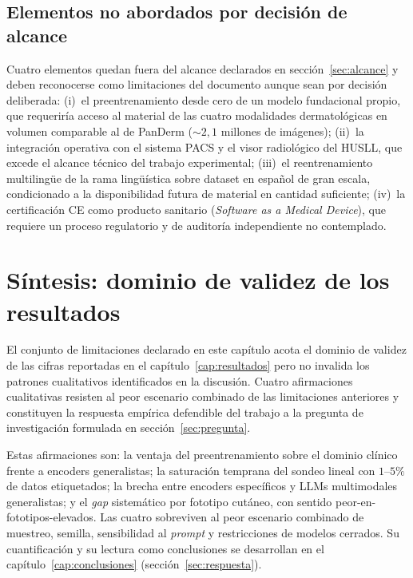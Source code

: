 \subsection{Elementos no abordados por decisión de alcance}
\label{sec:lim-fuera}

Cuatro elementos quedan fuera del alcance declarados en
sección~\ref{sec:alcance} y deben reconocerse como limitaciones del
documento aunque sean por decisión deliberada: (i)~el
preentrenamiento desde cero de un modelo fundacional propio, que
requeriría acceso al material de las cuatro modalidades
dermatológicas en volumen comparable al de PanDerm
($\sim 2{,}1$ millones de imágenes); (ii)~la integración
operativa con el sistema PACS y el visor radiológico del HUSLL,
que excede el alcance técnico del trabajo experimental;
(iii)~el reentrenamiento multilingüe de la rama lingüística sobre
dataset en español de gran escala, condicionado a la disponibilidad
futura de material en cantidad suficiente; (iv)~la certificación
CE como producto sanitario (\emph{Software as a Medical Device}),
que requiere un proceso regulatorio y de auditoría independiente
no contemplado.

\section{Síntesis: dominio de validez de los resultados}
\label{sec:lim-sintesis}

El conjunto de limitaciones declarado en este capítulo acota el
dominio de validez de las cifras reportadas en el
capítulo~\ref{cap:resultados} pero no invalida los patrones
cualitativos identificados en la discusión. Cuatro afirmaciones
cualitativas resisten al peor escenario combinado de las
limitaciones anteriores y constituyen la respuesta empírica
defendible del trabajo a la pregunta de investigación formulada
en sección~\ref{sec:pregunta}.

Estas afirmaciones son: la ventaja del preentrenamiento sobre el
dominio clínico frente a encoders generalistas; la saturación
temprana del sondeo lineal con $1$--$5\%$ de datos etiquetados; la
brecha entre encoders específicos y LLMs multimodales generalistas;
y el \emph{gap} sistemático por fototipo cutáneo, con sentido
peor-en-fototipos-elevados. Las cuatro sobreviven al peor escenario
combinado de muestreo, semilla, sensibilidad al \emph{prompt} y
restricciones de modelos cerrados. Su cuantificación y su lectura
como conclusiones se desarrollan en el
capítulo~\ref{cap:conclusiones} (sección~\ref{sec:respuesta}).

